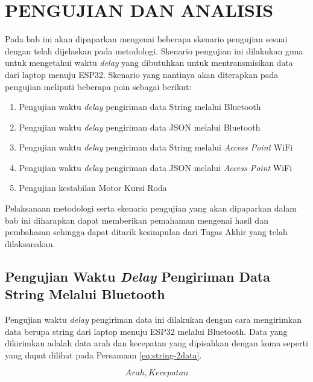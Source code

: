  \chapter{PENGUJIAN DAN ANALISIS}
\label{chap:pengujiananalisis}


Pada bab ini akan dipaparkan mengenai beberapa skenario pengujian sesuai dengan telah dijelaskan pada metodologi. Skenario pengujian ini dilakukan guna untuk mengetahui waktu \emph{delay} yang dibutuhkan untuk mentransmisikan data dari laptop menuju ESP32. Skenario yang nantinya akan diterapkan pada pengujian meliputi beberapa poin sebagai berikut:

\begin{enumerate}[nosep]
  \item Pengujian waktu \emph{delay} pengiriman data String melalui Bluetooth
  \item Pengujian waktu \emph{delay} pengiriman data JSON melalui Bluetooth
  \item Pengujian waktu \emph{delay} pengiriman data String melalui \emph{Access Point} WiFi
  \item Pengujian waktu \emph{delay} pengiriman data JSON melalui \emph{Access Point} WiFi
  \item Pengujian kestabilan Motor Kursi Roda
\end{enumerate}

Pelaksanaan metodologi serta skenario pengujian yang akan dipaparkan dalam bab ini diharapkan dapat memberikan pemahaman mengenai hasil dan pembahasan sehingga dapat ditarik kesimpulan dari Tugas Akhir yang telah dilaksanakan.


\section{Pengujian Waktu \emph{Delay} Pengiriman Data String Melalui Bluetooth}
\label{sec:delayBluetooth}

Pengujian waktu \emph{delay} pengiriman data ini dilakukan dengan cara mengirimkan data berupa string dari laptop menuju ESP32 melalui Bluetooth. Data yang dikirimkan adalah data arah dan kecepatan yang dipisahkan dengan koma seperti yang dapat dilihat pada Persamaan \ref{eq:string-2data}.

\begin{equation}
  \label{eq:string-2data}
    Arah,Kecepatan
\end{equation}

